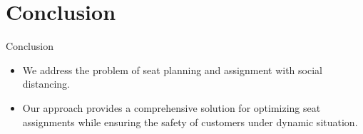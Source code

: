 
\section{Conclusion}
\frame{\sectionpage}

\begin{frame}{Conclusion}
    \begin{itemize}
        \item We address the problem of seat planning and assignment with social distancing.
        
        \item Our approach provides a comprehensive solution for optimizing seat assignments while ensuring the safety of customers under dynamic situation.

    \end{itemize}
\end{frame}
